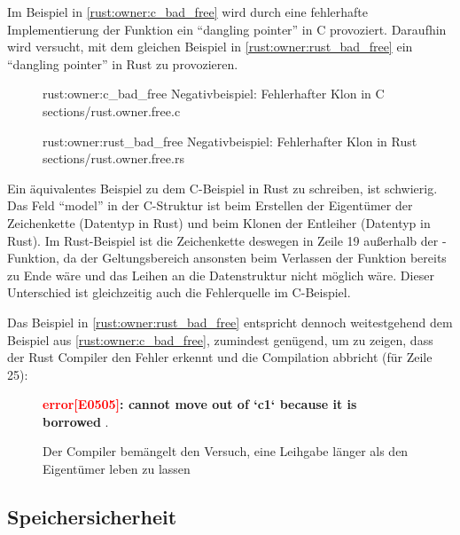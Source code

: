 Im Beispiel in \autoref{rust:owner:c_bad_free} wird durch eine fehlerhafte Implementierung der Funktion  ein \enquote{dangling pointer} in C provoziert.
Daraufhin wird versucht, mit dem gleichen Beispiel in \autoref{rust:owner:rust_bad_free} ein \enquote{dangling pointer} in Rust zu provozieren.



\begin{figure}[H]
	\ccinclude
	{rust:owner:c_bad_free}
	{Negativbeispiel: Fehlerhafter Klon in C}
	{sections/rust.owner.free.c}
\end{figure}

\begin{figure}[H]
	\rustcinclude
	{rust:owner:rust_bad_free}
	{Negativbeispiel: Fehlerhafter Klon in Rust}
	{sections/rust.owner.free.rs}
\end{figure}

Ein äquivalentes Beispiel zu dem C-Beispiel in Rust zu schreiben, ist schwierig.
Das Feld \enquote{model} in der C-Struktur ist beim Erstellen der Eigentümer der Zeichenkette (Datentyp  in Rust) und beim Klonen der Entleiher (Datentyp  in Rust).
Im Rust-Beispiel ist die Zeichenkette deswegen in Zeile 19 außerhalb der -Funktion, da der Geltungsbereich ansonsten beim Verlassen der Funktion bereits zu Ende wäre und das Leihen an die Datenstruktur nicht möglich wäre.
Dieser Unterschied ist gleichzeitig auch die Fehlerquelle im C-Beispiel.

Das Beispiel in \autoref{rust:owner:rust_bad_free} entspricht dennoch weitestgehend dem Beispiel aus \autoref{rust:owner:c_bad_free}, zumindest genügend, um zu zeigen, dass der Rust Compiler den Fehler erkennt und die Compilation abbricht (für Zeile 25):

\begin{figure}[H]
	\begin{tcolorbox}[colback=codeBackground,boxrule=0pt,arc=0pt]
		\begin{scriptsize}
			\textbf{\textcolor{red}{error[E0505]}: cannot move out of `c1` because it is borrowed} .
		\end{scriptsize}
	\end{tcolorbox}
	\caption{Der Compiler bemängelt den Versuch, eine Leihgabe länger als den Eigentümer leben zu lassen}
	\label{rust:rustc:error:no_dangling_pointer}
\end{figure}


\subsection{Speichersicherheit}
\label{rust:guarantee:memory_safety}


